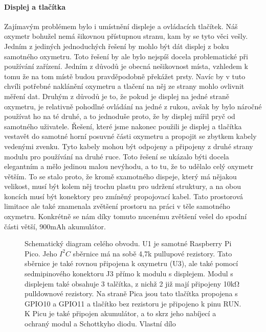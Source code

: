 \paragraph{Displej a tlačítka}
Zajímavým problémem bylo i umístnění displeje a ovládacích tlačítek. Náš oxymetr bohužel nemá šikovnou přístupnou stranu, kam by se tyto věci vešly. Jedním z jediných jednoduchých řešení by mohlo být dát displej z boku samotného oxymetru. Toto řešení by ale bylo nejspíš docela problematické při používání zařízení. Jedním z důvodů je obecná nešikovnost místa, vzhledem k tomu že na tom místě budou pravděpodobně překážet prsty. Navíc by v tuto chvíli potřebné naklánění oxymetru a tlačení na něj ze strany mohlo ovlivnit měření dat. Druhým z důvodů je to, že pokud je displej na jedné straně oxymetru, je relativně pohodlné ovládání na jedné z rukou, avšak by bylo náročné používat ho na té druhé, a to jednoduše proto, že by displej mířil pryč od samotného uživatele. Řešení, které jsme nakonec použili je displej a tlačítka vestavět do samotné horní posuvné části oxymetru a propojit se zbytkem kabely vedenými zvenku. Tyto kabely mohou být odpojeny a připojeny z druhé strany modulu pro používání na druhé ruce. Toto řešení se ukázalo býti docela elegantním a mělo jedinou malou nevýhodu, a to tu, že to udělalo celý oxymetr větším. To se stalo proto, že kromě sxamotného dispeje, který má nějakou velikost, musí být kolem něj trochu plastu pro udržení struktury, a na obou koncích musí být konektory pro zmíněný propojovací kabel. Tato prostorová limitace ale také znamenala zvětšení prostoru na práci v těle samotného oxymetru. Konkrétně se nám díky tomuto nucenému zvětšení vešel do spodní části větší, 900mAh akumulátor.
\begin{figure}[ht]
    \def\svgwidth{\columnwidth}
    
    \caption [Schematický diagram obvodu]{Schematický diagram celého obvodu. U1 je samotné Raspberry Pi Pico. Jeho $I^2C$ sběrnice má na sobě 4,7k pullupové rezistory. Tato sběrnice je také rovnou připojena k oxymetru (U3), ale také pomocí sedmipinového konektoru J3 přímo k modulu s displejem. Modul s displejem také obsahuje 3 talčítka, z nichž 2 již mají připojeny 10kΩ pulldownové rezistory. Na straně Pica jsou tato tlačítka propojena s GPIO10 a GPIO11 a tlačítko bez rezistoru je připojeno k pinu RUN. K Picu je také připojen akumulátor, a to skrz jeho nabíjecí a ochraný modul a Schottkyho diodu. Vlastní dílo}
    \label{fig:Diagram}
\end{figure}
